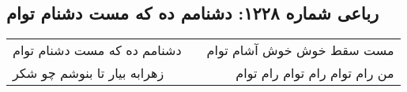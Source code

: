 \begin{center}
\section*{رباعی شماره ۱۲۲۸: دشنامم ده که مست دشنام توام}
\label{sec:1228}
\begin{longtable}{l p{0.5cm} r}
دشنامم ده که مست دشنام توام
&&
مست سقط خوش خوش آشام توام
\\
زهرابه بیار تا بنوشم چو شکر
&&
من رام توام رام توام رام توام
\\
\end{longtable}
\end{center}
